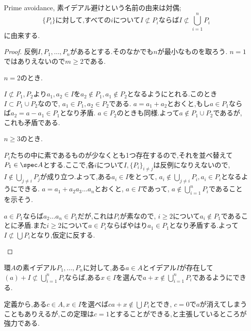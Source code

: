 Prime avoidance, 素イデアル避けという名前の由来は対偶;
\[\{P_i\}\text{に対して,すべての}i\text{について}I\not\subset P_i\text{ならば}I\not\subset\bigcup_{i=1}^n P_i\]
に由来する.
\begin{proof}
	反例$I,P_1,\dots, P_n$があるとする.そのなかでも$n$が最小なものを取ろう. $n=1$ではありえないので$m\geq 2$である.
	
	\begin{sakura}
		\item $n=2$のとき.
		
		$I\not\subset P_1,P_2$より$a_1,a_2\in I$を$a_2\not\in P_1,a_1\not\in P_2$となるようにとれる.このとき$I\subset P_1\cup P_2$なので, $a_1\in P_1,a_2\in P_2$である. $a=a_1+a_2$とおくと,もし$a\in P_1$ならば$a_2=a-a_1\in P_1$となり矛盾. $a\in P_2$のときも同様.よって$a\not\in P_1\cup P_2$であるが,これも矛盾である.
		
		\item $n\geq3$のとき.
		
		$P_i$たちの中に素であるものが少なくとも1つ存在するので,それを並べ替えて$P_1\in\spec A$とする.ここで,各$i$について$I,\{P_i\}_{i\neq j}$は反例になりえないので, $I\not\in\bigcup_{j\neq i}P_j$が成り立つ.よって,ある$a_i\in I$をとって, $a_i\not\in\bigcup_{j\neq i}P_i,a_i\in P_i$となるようにできる. $a=a_1+a_2a_3\dots a_n$とおくと, $a\in I$であって, $a\not\in\bigcup_{i=1}^n P_i$であることを示そう.
		
		$a\in P_1$ならば$a_2\dots a_n\in P_1$だが,これは$P_i$が素なので, $i\geq2$について$a_i\not\in P_1$であることに矛盾.また$i\geq2$について$a\in P_i$ならばやはり$a_1\in P_1$となり矛盾する.よって$I\not\subset\bigcup P_i$となり,仮定に反する.
	\end{sakura}
\end{proof}

\begin{thm}[Davisの補題]
	環$A$の素イデアル$P_1,\dots,P_n$に対して,ある$a\in A$とイデアル$I$が存在して$(a)+I\not\subset\bigcup_{i=1}^n P_i$ならば,ある$x\in I$を選んで$a+x\not\in\bigcup_{i=1}^n P_i$であるようにできる.
\end{thm}

定義から,ある$c\in A,x\in I$を選べば$ca+x\not\in\bigcup P_i$とでき, $c=0$で$a$が消えてしまうこともありえるが,この定理は$c=1$とすることができる,と主張しているところが強力である.

